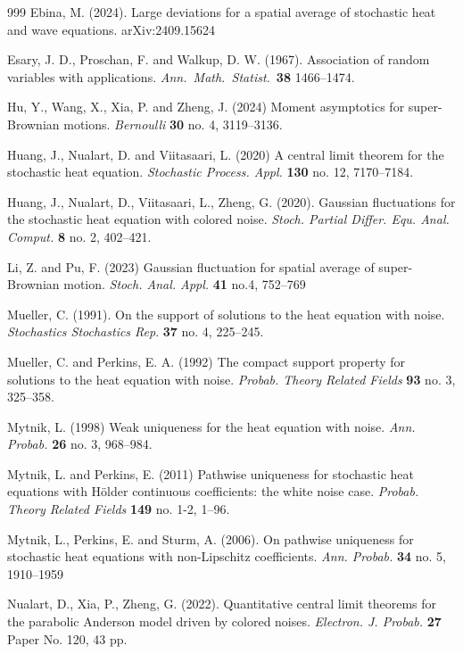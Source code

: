 \documentclass[12pt, reqno]{amsart}
\newcommand{\<}{\langle}
\renewcommand{\>}{\rangle}
\begin{document}
\begin{thebibliography}{999}
Ebina, M. (2024). Large deviations for a spatial average of stochastic heat and wave equations.
arXiv:2409.15624

	Esary, J. D., Proschan, F. and Walkup, D. W. (1967).
	Association of random variables with applications.
	{\it Ann.\ Math.\ Statist.}\ {\bf 38} 1466--1474. 



Hu, Y., Wang, X., Xia, P. and Zheng, J. (2024)
Moment asymptotics for super-Brownian motions.
{\it Bernoulli} {\bf30}  no. 4, 3119–3136.


Huang, J.,  Nualart, D. and Viitasaari, L. (2020)
 A central limit theorem for the stochastic heat equation.
{\it Stochastic Process. Appl.} {\bf 130}  no. 12, 7170–7184.

	Huang, J., Nualart, D., Viitasaari, L., Zheng, G. (2020). Gaussian fluctuations for the stochastic heat equation with colored noise.
{\it Stoch. Partial Differ. Equ. Anal. Comput.} {\bf8} no. 2, 402–421.


 Li, Z. and Pu, F. (2023) Gaussian fluctuation for spatial average of super-Brownian motion. 
 \textit{Stoch. Anal. Appl.} {\bf 41} no.4, 752--769 
 
 Mueller, C. (1991).
On the support of solutions to the heat equation with noise.
{\it Stochastics Stochastics Rep}. {\bf 37} no. 4, 225–245.

Mueller, C. and Perkins, E. A. (1992)
The compact support property for solutions to the heat equation with noise.
{\it Probab. Theory Related Fields} {\bf93} no. 3, 325–358.

Mytnik, L. (1998)
Weak uniqueness for the heat equation with noise.
{\it Ann. Probab.} {\bf 26} no. 3, 968–984.


Mytnik, L. and Perkins, E. (2011)
Pathwise uniqueness for stochastic heat equations with H\"older continuous coefficients: the white noise case.
{\it Probab. Theory Related Fields} {\bf 149} no. 1-2, 1–96.

Mytnik, L.,  Perkins, E. and Sturm, A. (2006).
On pathwise uniqueness for stochastic heat equations with non-Lipschitz coefficients.
{\it Ann. Probab.} {\bf34} no. 5, 1910–1959


	Nualart, D., Xia, P.,  Zheng, G. (2022). Quantitative central limit theorems for the parabolic Anderson model driven by colored noises. {\it Electron. J. Probab.} {\bf 27}  Paper No. 120, 43 pp.


\end{thebibliography}
\end{document}
